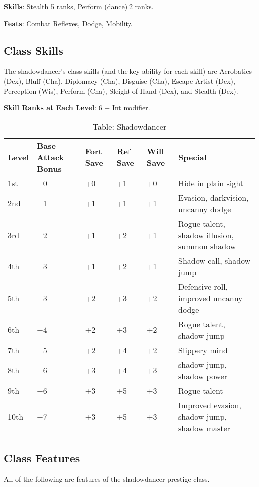 \textbf{Skills}: Stealth 5 ranks, Perform (dance) 2 ranks.
				
\textbf{Feats}: Combat Reflexes, Dodge, Mobility. 
				
\subsection{Class Skills}

				
The shadowdancer's class skills (and the key ability for each skill) are Acrobatics (Dex), Bluff (Cha), Diplomacy (Cha), Disguise (Cha), Escape Artist (Dex), Perception (Wis), Perform (Cha), Sleight of Hand (Dex), and Stealth (Dex).
				
\textbf{ Skill Ranks at Each Level}: 6 + Int modifier.

\begin{table}[]
\sffamily
\caption{Table: Shadowdancer}
\begin{tabular}{llllll}
\textbf{Level} & \textbf{Base Attack Bonus} & \textbf{Fort Save} & \textbf{Ref Save} & \textbf{Will Save} & \textbf{Special}\\
1st & +0 & +0 & +1 & +0 & Hide in plain sight\\
2nd & +1 & +1 & +1 & +1 & Evasion, darkvision, uncanny dodge\\
3rd & +2 & +1 & +2 & +1 & Rogue talent, shadow illusion, summon shadow\\
4th & +3 & +1 & +2 & +1 & Shadow call, shadow jump\\
5th & +3 & +2 & +3 & +2 & Defensive roll, improved uncanny dodge\\
6th & +4 & +2 & +3 & +2 & Rogue talent, shadow jump\\
7th & +5 & +2 & +4 & +2 & Slippery mind\\
8th & +6 & +3 & +4 & +3 & shadow jump, shadow power\\
9th & +6 & +3 & +5 & +3 & Rogue talent\\
10th & +7 & +3 & +5 & +3 & Improved evasion, shadow jump, shadow master\\
\end{tabular}
\end{table}
	
\subsection{Class Features}

				
All of the following are features of the shadowdancer prestige class.
				
